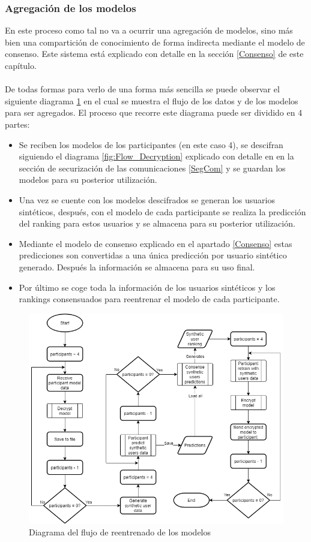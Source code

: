 \subsubsection{Agregación de los modelos}
En este proceso como tal no va a ocurrir una agregación de modelos, sino más bien una compartición de conocimiento de forma indirecta mediante el modelo de consenso. Este sistema está explicado con detalle en la sección \ref{Consenso} de este capítulo.
\\ \\
De todas formas para verlo de una forma más sencilla se puede observar el siguiente diagrama \ref{fig:Flow_Agregation} en el cual se muestra el flujo de los datos y de los modelos para ser agregados. El proceso que recorre este diagrama puede ser dividido en 4 partes:
\begin{itemize}
    \item Se reciben los modelos de los participantes (en este caso 4), se descifran siguiendo el diagrama \ref{fig:Flow_Decryption} explicado con detalle en en la sección de securización de las comunicaciones \ref{SegCom} y se guardan los modelos para su posterior utilización.
    \item Una vez se cuente con los modelos descifrados se generan los usuarios sintéticos, después, con el modelo de cada participante se realiza la predicción del ranking para estos usuarios y se almacena para su posterior utilización. 
    \item Mediante el modelo de consenso explicado en el apartado \ref{Consenso} estas predicciones son convertidas a una única predicción por usuario sintético generado. Después la información se almacena para su uso final.
    \item Por último se coge toda la información de los usuarios sintéticos y los rankings consensuados para reentrenar el modelo de cada participante. 
\end{itemize}
\begin{figure}[H]
    \centering
    \includegraphics[width=\textwidth]{Figuras/flowchart_agregation.png}    
    \caption{Diagrama del flujo de reentrenado de los modelos} 
    \label{fig:Flow_Agregation}
\end{figure}
\newpage
